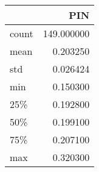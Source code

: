 \begin{tabular}{lr}
\toprule
{} &         PIN \\
\midrule
count &  149.000000 \\
mean  &    0.203250 \\
std   &    0.026424 \\
min   &    0.150300 \\
25\%   &    0.192800 \\
50\%   &    0.199100 \\
75\%   &    0.207100 \\
max   &    0.320300 \\
\bottomrule
\end{tabular}

